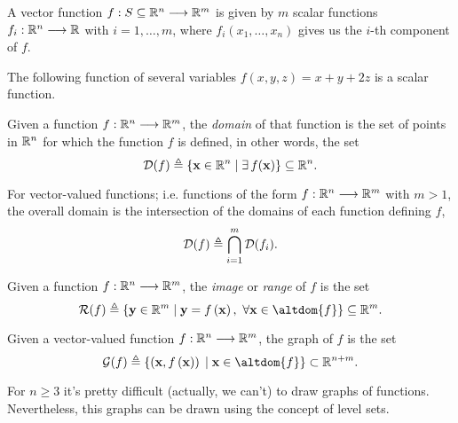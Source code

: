 \begin{remark}
	A vector function $\appl{f}{S\subseteq\Rtn}{\R^m}$ is given by $m$ scalar functions $\appl{f_i}{\Rtn}{\R}$ with $i = 1, \ldots,
	m$, where $f_i(x_1, \ldots, x_n)$ gives us the $i$-th component of $f$.
\end{remark}

\begin{example}
    The following function of several variables $f(x, y, z) = x + y + 2z$ is a scalar function.
\end{example}


\begin{defn}[Domain]
Given a function $\stdvf$, the \textit{domain} of that function is the set of points in $\Rtn$ for which the function $f$ is 
defined, in other words, the set
\begin{equation}
\dom{f} \bydef \{\vec{x}\in\Rtn\st\exists f(\vec{x})\}\subseteq\Rtn.
\end{equation}
\end{defn}

\noindent For vector-valued functions; i.e. functions of the form $\stdvf$ with $m > 1$, the overall domain is the intersection of the
domains of each function defining $f$,
\begin{equation}
\dom{f}\bydef\bigcap_{i=1}^m\dom{f_i}.
\end{equation}

\begin{defn}[Image]
Given a function $\stdvf$, the \textit{image} or \textit{range} of $f$ is the set
\begin{equation}
\image{f}\bydef\{\vec{y}\in\R^m\st \vec{y} = f\left(\vec{x}\right),\ \forall\vec{x}\in\altdom{f}\}\subseteq\R^m.
\end{equation}
\end{defn}

\begin{defn}[Graph]
Given a vector-valued function $\stdvf$, the graph of $f$ is the set
\begin{equation}
\fgraph{f}\bydef\{\left(\vec{x}, f\left(\vec{x}\right)\right)\st\vec{x}\in\altdom{f}\}\subset\R^{n + m}.
\end{equation}
\end{defn}

For $n\geq 3$ it's pretty difficult (actually, we can't) to draw graphs of functions. Nevertheless, this graphs
can be drawn using the concept of level sets.

